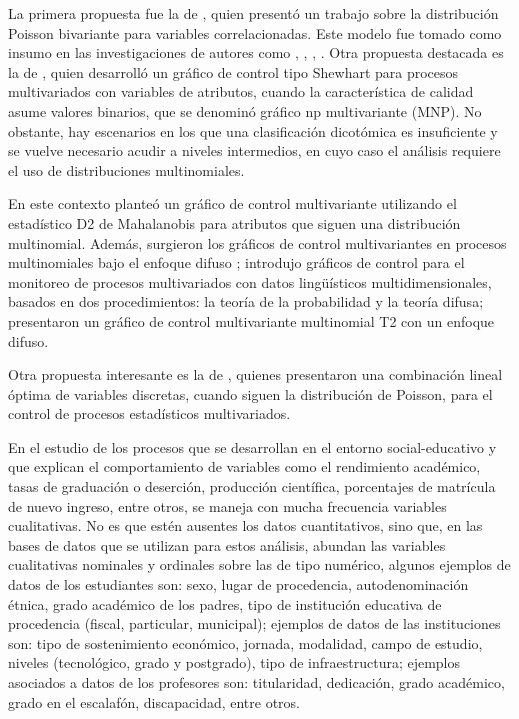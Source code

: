 \documentclass[water,article,submit,moreauthors,pdftex]{mdpi}
\begin{document}
La primera propuesta fue la de \citet{holgate1964}, quien presentó un
trabajo sobre la distribución Poisson bivariante para variables
correlacionadas. Este modelo fue tomado como insumo en las
investigaciones de autores como \citet{chiu2007}, \citet{ho2009},
\citet{laungrungrong2011ewma}, \citet{epprecht2013optimal}. Otra
propuesta destacada es la de \citet{lu1998control}, quien desarrolló un
gráfico de control tipo Shewhart para procesos multivariados con
variables de atributos, cuando la característica de calidad asume
valores binarios, que se denominó gráfico np multivariante (MNP). No
obstante, hay escenarios en los que una clasificación dicotómica es
insuficiente y se vuelve necesario acudir a niveles intermedios, en cuyo
caso el análisis requiere el uso de distribuciones multinomiales.

En este contexto \citet{ranjan2008multivariate} planteó un gráfico de
control multivariante utilizando el estadístico D2 de Mahalanobis para
atributos que siguen una distribución multinomial. Además, surgieron los
gráficos de control multivariantes en procesos multinomiales bajo el
enfoque difuso \citep{taleb2006multivariate}; \citet{taleb2009control}
introdujo gráficos de control para el monitoreo de procesos
multivariados con datos lingüísticos multidimensionales, basados en dos
procedimientos: la teoría de la probabilidad y la teoría difusa;
\citet{pastuizaca2015multivariate} presentaron un gráfico de control
multivariante multinomial T2 con un enfoque difuso.

Otra propuesta interesante es la de \citet{epprecht2013optimal}, quienes
presentaron una combinación lineal óptima de variables discretas, cuando
siguen la distribución de Poisson, para el control de procesos
estadísticos multivariados.

En el estudio de los procesos que se desarrollan en el entorno
social-educativo y que explican el comportamiento de variables como el
rendimiento académico, tasas de graduación o deserción, producción
científica, porcentajes de matrícula de nuevo ingreso, entre otros, se
maneja con mucha frecuencia variables cualitativas. No es que estén
ausentes los datos cuantitativos, sino que, en las bases de datos que se
utilizan para estos análisis, abundan las variables cualitativas
nominales y ordinales sobre las de tipo numérico, algunos ejemplos de
datos de los estudiantes son: sexo, lugar de procedencia,
autodenominación étnica, grado académico de los padres, tipo de
institución educativa de procedencia (fiscal, particular, municipal);
ejemplos de datos de las instituciones son: tipo de sostenimiento
económico, jornada, modalidad, campo de estudio, niveles (tecnológico,
grado y postgrado), tipo de infraestructura; ejemplos asociados a datos
de los profesores son: titularidad, dedicación, grado académico, grado
en el escalafón, discapacidad, entre otros.
\end{document}
